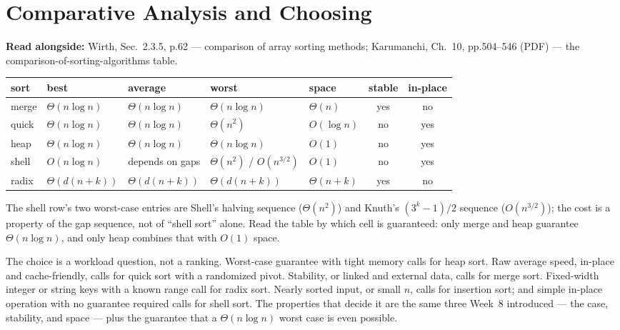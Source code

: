 \documentclass[11pt]{article}
\begin{document}
\section{Comparative Analysis and Choosing}

\textbf{Read alongside:} Wirth, Sec.~2.3.5, p.62 --- comparison of array sorting methods; Karumanchi, Ch.~10, pp.504--546 (PDF) --- the comparison-of-sorting-algorithms table.

\begin{center}
{\footnotesize
\begin{tabular}{l l l l l c c}
  \toprule
  \textbf{sort} & \textbf{best} & \textbf{average} & \textbf{worst} &
    \textbf{space} & \textbf{stable} & \textbf{in-place} \\
  \midrule
  merge & $\Theta(n\log n)$ & $\Theta(n\log n)$ & $\Theta(n\log n)$ &
    $\Theta(n)$ & yes & no \\
  quick & $\Theta(n\log n)$ & $\Theta(n\log n)$ & $\Theta(n^2)$ &
    $O(\log n)$ & no & yes \\
  heap & $\Theta(n\log n)$ & $\Theta(n\log n)$ & $\Theta(n\log n)$ &
    $O(1)$ & no & yes \\
  shell & $O(n\log n)$ & depends on gaps & $\Theta(n^2)$ / $O(n^{3/2})$ &
    $O(1)$ & no & yes \\
  radix & $\Theta(d(n+k))$ & $\Theta(d(n+k))$ & $\Theta(d(n+k))$ &
    $\Theta(n+k)$ & yes & no \\
  \bottomrule
\end{tabular}}
\end{center}

The shell row's two worst-case entries are Shell's halving sequence ($\Theta(n^2)$) and Knuth's $(3^k-1)/2$ sequence ($O(n^{3/2})$); the cost is a property of the gap sequence, not of ``shell sort'' alone. Read the table by which cell is guaranteed: only merge and heap guarantee $\Theta(n\log n)$, and only heap combines that with $O(1)$ space.

The choice is a workload question, not a ranking. Worst-case guarantee with tight memory calls for heap sort. Raw average speed, in-place and cache-friendly, calls for quick sort with a randomized pivot. Stability, or linked and external data, calls for merge sort. Fixed-width integer or string keys with a known range call for radix sort. Nearly sorted input, or small $n$, calls for insertion sort; and simple in-place operation with no guarantee required calls for shell sort. The properties that decide it are the same three Week~8 introduced --- the case, stability, and space --- plus the guarantee that a $\Theta(n\log n)$ worst case is even possible.
\end{document}
